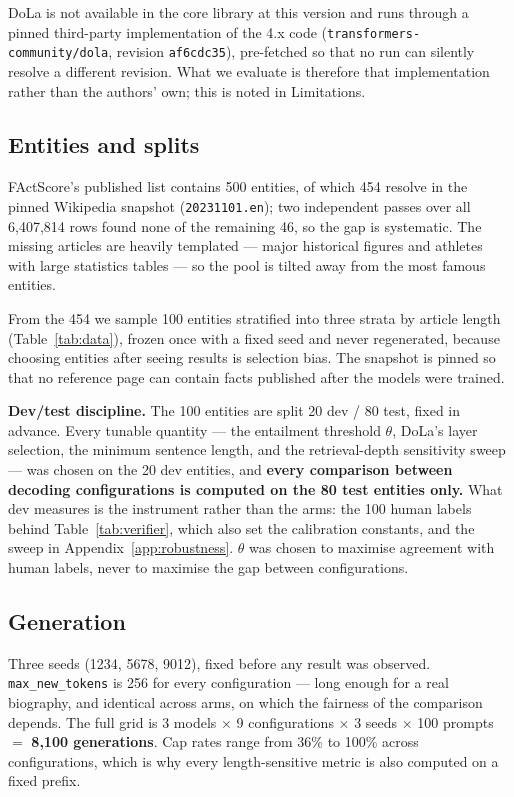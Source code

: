 \documentclass[11pt]{article}
\begin{document}
DoLa is not available in the core library at this version and runs through a
pinned third-party implementation of the 4.x code
(\texttt{transformers-community/dola}, revision \texttt{af6cdc35}), pre-fetched
so that no run can silently resolve a different revision. What we evaluate is
therefore that implementation rather than the authors' own; this is noted in
Limitations.

\subsection{Entities and splits}

FActScore's published list contains 500 entities, of which 454 resolve in the
pinned Wikipedia snapshot (\texttt{20231101.en}); two independent passes over all
6{,}407{,}814 rows found none of the remaining 46, so the gap is systematic. The missing articles are heavily templated --- major
historical figures and athletes with large statistics tables --- so the pool is
tilted away from the most famous entities.

From the 454 we sample 100 entities stratified into three strata by article
length (Table~\ref{tab:data}), frozen once with a fixed seed and never
regenerated, because choosing entities after seeing results is selection bias.
The snapshot is pinned so that no reference page can contain facts published
after the models were trained.

\textbf{Dev/test discipline.} The 100 entities are split 20 dev / 80 test, fixed
in advance. Every tunable quantity --- the entailment threshold $\theta$,
DoLa's layer selection, the minimum sentence length, and the retrieval-depth
sensitivity sweep --- was chosen on the 20 dev entities, and \textbf{every
comparison between decoding configurations is computed on the 80 test entities
only.} What dev measures is the instrument rather than the arms: the 100 human
labels behind Table~\ref{tab:verifier}, which also set the calibration
constants, and the sweep in Appendix~\ref{app:robustness}. $\theta$ was chosen
to maximise agreement with human labels, never to maximise the gap between
configurations.

\subsection{Generation}

Three seeds (1234, 5678, 9012), fixed before any result was observed.
\texttt{max\_new\_tokens} is 256 for every configuration --- long enough for a
real biography, and identical across arms, on which the fairness of the
comparison depends. The full grid is 3 models $\times$ 9 configurations
$\times$ 3 seeds $\times$ 100 prompts $=$ \textbf{8{,}100 generations}. Cap
rates range from 36\% to 100\% across configurations, which is why every
length-sensitive metric is also computed on a fixed prefix.
\end{document}
